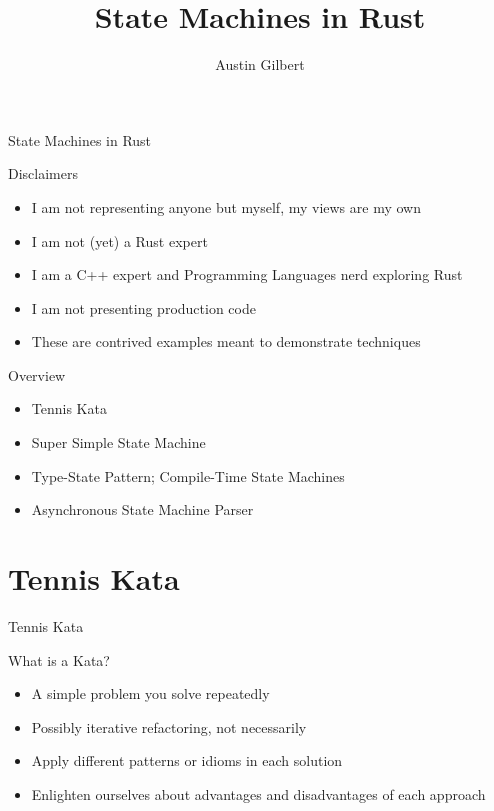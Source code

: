 \documentclass[aspectratio=169]{beamer}
\title{State Machines in Rust}
\author{Austin Gilbert}
\begin{document}
\begin{frame}
\begin{center}
\begin{Huge}
State Machines in Rust
\end{Huge}
\end{center}
\end{frame}

\begin{frame}{Disclaimers}
\begin{itemize}
\item I am not representing anyone but myself, my views are my own
\item I am not (yet) a Rust expert
\item I am a C++ expert and Programming Languages nerd exploring Rust
\item I am not presenting production code
\item These are contrived examples meant to demonstrate techniques
\end{itemize}
\end{frame}

\begin{frame}{Overview}
\begin{itemize}
\item Tennis Kata
\item Super Simple State Machine
\item Type-State Pattern; Compile-Time State Machines
\item Asynchronous State Machine Parser
\end{itemize}
\end{frame}

\section{Tennis Kata}
\begin{frame}
\begin{center}
\begin{Huge}
Tennis Kata
\end{Huge}
\end{center}
\end{frame}

\begin{frame}{What is a Kata?}
\begin{itemize}
\item A simple problem you solve repeatedly
\item Possibly iterative refactoring, not necessarily
\item Apply different patterns or idioms in each solution
\item Enlighten ourselves about advantages and disadvantages of each approach
\end{itemize}
\end{frame}
\end{document}
